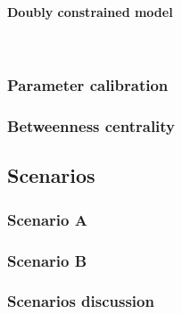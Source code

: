 \documentclass{article}
\begin{document}
\paragraph{Doubly constrained model}\mbox{}\\

\subsubsection{Parameter calibration}

\subsubsection{Betweenness centrality}

\subsection{Scenarios}

\subsubsection{Scenario A}

\subsubsection{Scenario B}

\subsubsection{Scenarios discussion}



\end{document}
